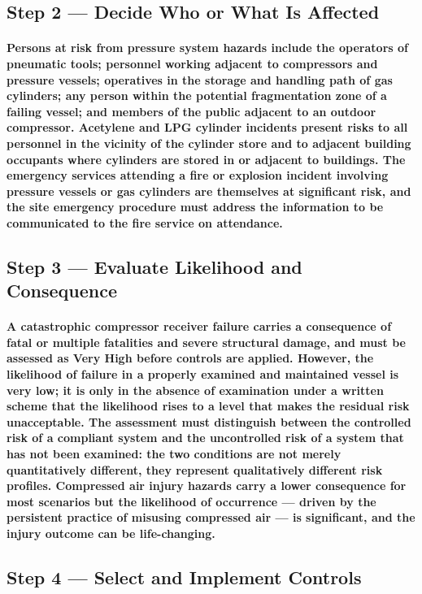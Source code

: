 \subsection{Step 2 --- Decide Who or What Is Affected}
\paragraph{Persons at risk from pressure system hazards include the operators of pneumatic tools; personnel working adjacent to compressors and pressure vessels; operatives in the storage and handling path of gas cylinders; any person within the potential fragmentation zone of a failing vessel; and members of the public adjacent to an outdoor compressor. Acetylene and LPG cylinder incidents present risks to all personnel in the vicinity of the cylinder store and to adjacent building occupants where cylinders are stored in or adjacent to buildings. The emergency services attending a fire or explosion incident involving pressure vessels or gas cylinders are themselves at significant risk, and the site emergency procedure must address the information to be communicated to the fire service on attendance.}

\subsection{Step 3 --- Evaluate Likelihood and Consequence}
\paragraph{A catastrophic compressor receiver failure carries a consequence of fatal or multiple fatalities and severe structural damage, and must be assessed as Very High before controls are applied. However, the likelihood of failure in a properly examined and maintained vessel is very low; it is only in the absence of examination under a written scheme that the likelihood rises to a level that makes the residual risk unacceptable. The assessment must distinguish between the controlled risk of a compliant system and the uncontrolled risk of a system that has not been examined: the two conditions are not merely quantitatively different, they represent qualitatively different risk profiles. Compressed air injury hazards carry a lower consequence for most scenarios but the likelihood of occurrence --- driven by the persistent practice of misusing compressed air --- is significant, and the injury outcome can be life-changing.}

\subsection{Step 4 --- Select and Implement Controls}
